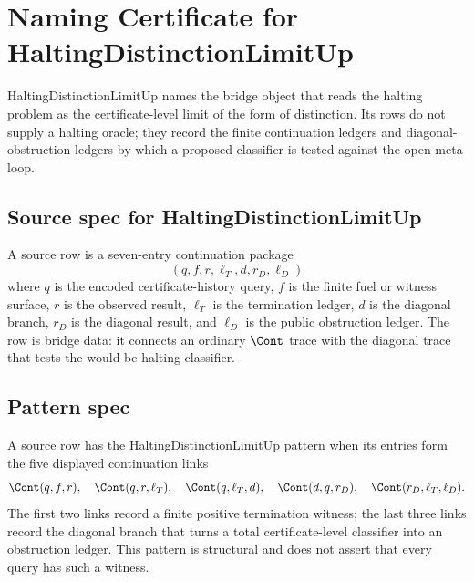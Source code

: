 \chapter{Naming Certificate for HaltingDistinctionLimitUp}
\label{ch:concrete-instances-halting-as-form-of-distinction-limit}

HaltingDistinctionLimitUp names the bridge object that reads the halting problem as the certificate-level limit of the form of distinction. Its rows do not supply a halting oracle; they record the finite continuation ledgers and diagonal-obstruction ledgers by which a proposed classifier is tested against the open meta loop.

\section{Source spec for HaltingDistinctionLimitUp}
\label{sec:concrete-instances-halting-as-form-of-distinction-limit-source-spec}

\begin{definition}
\label{def:concrete-instances-halting-as-form-of-distinction-limit-source-rows}
A source row is a seven-entry continuation package
$$
(q, f, r, \ell_T, d, r_D, \ell_D)
$$
where $q$ is the encoded certificate-history query, $f$ is the finite fuel or witness surface, $r$ is the observed result, $\ell_T$ is the termination ledger, $d$ is the diagonal branch, $r_D$ is the diagonal result, and $\ell_D$ is the public obstruction ledger. The row is bridge data: it connects an ordinary $\Cont$ trace with the diagonal trace that tests the would-be halting classifier.
\end{definition}

\section{Pattern spec}
\label{sec:concrete-instances-halting-as-form-of-distinction-limit-pattern}

\begin{definition}
\label{def:concrete-instances-halting-as-form-of-distinction-limit-pattern}
A source row has the HaltingDistinctionLimitUp pattern when its entries form the five displayed continuation links
$$
\begin{aligned}
\Cont(q,f,r),\quad
\Cont(q,r,\ell_T),\quad
\Cont(q,\ell_T,d),\quad
\Cont(d,q,r_D),\quad
\Cont(r_D,\ell_T,\ell_D).
\end{aligned}
$$
The first two links record a finite positive termination witness; the last three links record the diagonal branch that turns a total certificate-level classifier into an obstruction ledger. This pattern is structural and does not assert that every query has such a witness.
\end{definition}

